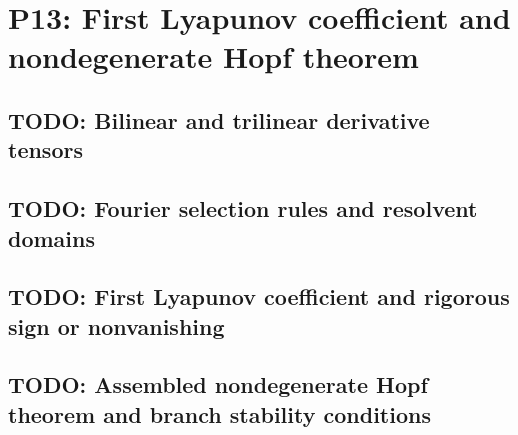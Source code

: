 
\section{P13: First Lyapunov coefficient and nondegenerate Hopf theorem}
\label{sec:P13}

\subsection{TODO: Bilinear and trilinear derivative tensors}
\label{slot:P13-1}

\subsection{TODO: Fourier selection rules and resolvent domains}
\label{slot:P13-2}

\subsection{TODO: First Lyapunov coefficient and rigorous sign or nonvanishing}
\label{slot:P13-3}

\subsection{TODO: Assembled nondegenerate Hopf theorem and branch stability conditions}
\label{slot:P13-4}
